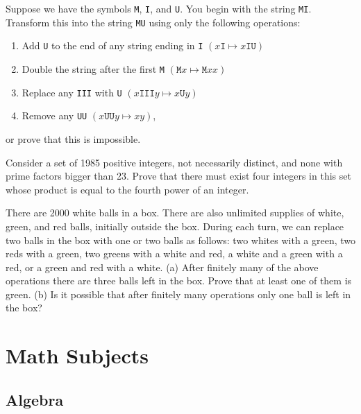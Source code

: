 \documentclass[12pt]{article}
\begin{document}
        \begin{exercise}
            Suppose we have the symbols \texttt{M}, \texttt{I}, and \texttt{U}.
            You begin with the string \texttt{MI}.
            Transform this into the string \texttt{MU} using only the following operations:
            \begin{enumerate}
                \item Add \texttt{U} to the end of any string ending in \texttt{I} \((x\texttt{I}\mapsto x\texttt{IU})\)
                \item Double the string after the first \texttt{M} \((\texttt{M}x\mapsto\texttt{M}xx)\)
                \item Replace any \texttt{III} with \texttt{U} \((x\texttt{III}y\mapsto x\texttt{U}y)\)
                \item Remove any \texttt{UU} \((x\texttt{UU}y\mapsto xy)\),
            \end{enumerate}
            or prove that this is impossible.
        \end{exercise}
    
        \begin{exercise}[IMO 1985]
            Consider a set of 1985 positive integers, not necessarily distinct, and none with prime factors bigger than 23. Prove that there must exist four integers in this set whose product is equal to the fourth power of an integer.
        \end{exercise}
    
        \begin{exercise}
            There are 2000 white balls in a box. There are also unlimited supplies of white, green, and red balls, initially outside the box. During each turn, we can replace two balls in the box with one or two balls as follows: two whites with a green, two reds with a green, two greens with a white and red, a white and a green with a red, or a green and red with a white. (a) After finitely many of the above operations there are three balls left in the box. Prove that at least one of them is green. (b) Is it possible that after finitely many operations only one ball is left in the box?
        \end{exercise}

\section{Math Subjects}

    \subsection{Algebra}
\end{document}

